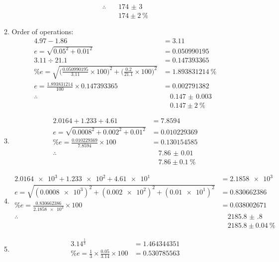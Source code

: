 \documentclass{article}
\begin{document}
\begin{enumerate}[start=14]
\begin{enumerate}
\begin{align*}
				\therefore &\quad \boxed{\num{174(3)}} \\
				&\quad \boxed{174 \pm \SI{2}{\percent}}
			\end{align*}
		\item Order of operations:
			\begin{align*}
				4.97 - 1.86 &= 3.11 \\
				e = \sqrt{0.05^2 + 0.01^2} &= \num{0.050990195} \\
				3.11 \div 21.1 &= \num{0.147393365} \\
				\%e = \sqrt{\bigg(\frac{\num{0.050990195}}{3.11}\times 100 \bigg)^2
					+ \bigg(\frac{0.2}{21.1}\times 100 \bigg)^2
				} &= \SI{1.893831214}{\percent} \\
				e = \frac{\num{1.893831214}}{100} \times \num{0.147393365} &=
				\num{0.002791382} \\
				\therefore &\quad \boxed{\num{0.147(3)}} \\
				&\quad \boxed{0.147 \pm \SI{2}{\percent}}
			\end{align*}
		\item \begin{align*}
				\num{2.0164} + \num{1.233} + \num{4.61} &= \num{7.8594} \\
				e = \sqrt{\num{0.0008}^2 + 0.002^2 + 0.01^2} &= \num{0.010229369} \\
				\%e = \frac{\num{0.010229369}}{\num{7.8594}} \times 100 &= \num{0.130154585} \\
				\therefore &\quad \boxed{\num{7.86(1)}} \\
				&\quad \boxed{7.86 \pm \SI{0.1}{\percent}}
			\end{align*}
		\item \begin{align*}
				\num{2.0164e3} + \num{1.233e2} + \num{4.61e1} &= \num{2.1858e3} \\
				e = \sqrt{(\num{0.0008e3})^2 + (\num{0.002e2})^2 + (\num{0.01e1})^2} &= \num{0.830662386} \\
				\%e = \frac{\num{0.830662386}}{\num{2.1858e3}} \times 100 &= \num{0.038002671} \\
				\therefore &\quad \boxed{\num{2185.8(8)}} \\
				&\quad \boxed{2185.8 \pm \SI{0.04}{\percent}}
			\end{align*}
		\item \begin{align*}
				3.14^{\frac{1}{3}} &= \num{1.464344351} \\
				\%e = \frac{1}{3} \times \frac{0.05}{3.14} \times 100 &= \num{0.530785563} \\

\end{align*}
\end{enumerate}
\end{enumerate}
\end{document}
